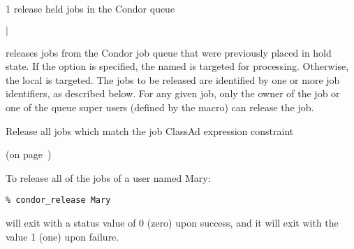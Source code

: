 \begin{ManPage}{\label{man-condor-release}}{1}
{release held jobs in the Condor queue}
\Synopsis {}
\ToolArgsBase 

\ToolDebugOption
\ToolLocate
\ToolJobs
$|$  \Dots

\ToolDebugOption
\ToolLocate
\ToolAll


\Description

 releases jobs from the Condor job queue that were 
previously placed in hold state.  
If the  option is specified, the named  is targeted
for processing.  
Otherwise, the local  is targeted.
The jobs to be released are identified by one or more job identifiers, as
described below.
For any given job, only the owner of the job or one of the queue super users
(defined by the  macro) can release the job.

\begin{Options}
	\ToolArgsBaseDesc
	\ToolLocateDesc
	\ToolDebugDesc
	 {Release all jobs which match
	                the job ClassAd expression constraint}
\end{Options}

\SeeAlso
{} (on page~\pageref{man-condor-hold})


\Examples
To release all of the jobs of a user named Mary:
\footnotesize
\begin{verbatim}
% condor_release Mary 
\end{verbatim}
\normalsize

\ExitStatus

 will exit with a status value of 0 (zero) upon success,
and it will exit with the value 1 (one) upon failure.

\end{ManPage}
